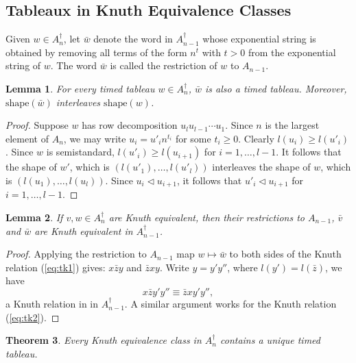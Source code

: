\documentclass[10pt]{amsproc}
\newtheorem{theorem}{Theorem}[subsection]
\newtheorem{lemma}[theorem]{Lemma}
\theoremstyle{definition}
\theoremstyle{remark}
\newcommand{\shape}{\mathrm{shape}}
\begin{document}
\subsection{Tableaux in Knuth Equivalence Classes}
\label{sec:tabl-knuth-equiv}
Given $w\in A_n^\dagger$, let $\bar w$ denote the word in $A_{n-1}^\dagger$ whose exponential string is obtained by removing all terms of the form $n^t$ with $t>0$ from the exponential string of $w$.
The word $\bar w$ is called the restriction of $w$ to $A_{n-1}$.
\begin{lemma}
  \label{lemma:restriction-interleaf}
  For every timed tableau $w\in A_n^\dagger$, $\bar w$ is also a timed tableau. Moreover, $\shape(\bar w)$ interleaves $\shape(w)$.
\end{lemma}
\begin{proof}
  Suppose $w$ has row decomposition $u_lu_{l-1}\dotsb u_1$.
  Since $n$ is the largest element of $A_n$, we may write $u_i=u'_in^{t_i}$ for some $t_i\geq 0$.
  Clearly $l(u_i)\geq l(u'_i)$.
  Since $w$ is semistandard, $l(u'_i)\geq l(u_{i+1})$ for $i=1,\dotsc,l-1$. 
  It follows that the shape of $w'$, which is $(l(u'_1),\dotsc,l(u'_l))$ interleaves the shape of $w$, which is $(l(u_1),\dotsc,l(u_l))$.
  Since $u_i\lhd u_{i+1}$, it follows that $u'_i\lhd u_{i+1}$ for $i=1,\dotsc,l-1$.
\end{proof}
\begin{lemma}
  \label{lemma:equivalence-restriction}
  If $v,w\in A_n^\dagger$ are Knuth equivalent, then their restrictions to $A_{n-1}$, $\bar v$ and $\bar w$ are Knuth equivalent in $A_{n-1}^\dagger$.
\end{lemma}
\begin{proof}
  Applying the restriction to $A_{n-1}$ map $w\mapsto \bar w$ to both sides of the Knuth relation (\ref{eq:tk1}) gives:
  $x\bar z y$ and $\bar z x y$.
  Write $y=y'y''$, where $l(y')=l(\bar z)$, we have
  \begin{displaymath}
    x\bar zy'y'' \equiv \bar zxy'y'',
  \end{displaymath}
  a Knuth relation in in $A_{n-1}^\dagger$.
  A similar argument works for the Knuth relation (\ref{eq:tk2}).
\end{proof}
\begin{theorem}
  \label{theorem:unique-timed-tableaux}
  Every Knuth equivalence class in $A_n^\dagger$ contains a unique timed tableau.
\end{theorem}
\end{document}
